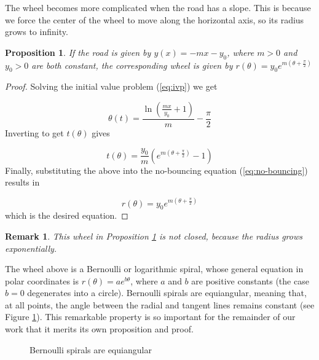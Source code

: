\documentclass{article}
\theoremstyle{theorem}
\newtheorem{prop}{Proposition}[section]
\theoremstyle{theorem}
\newtheorem{remark}{Remark}[section]
\begin{document}
The wheel becomes more complicated when the road has a slope. This is
because we force the center of the wheel to move along the horizontal
axis, so its radius grows to infinity.

\begin{prop}
  \label{spiral-wheel}
  If the road is given by $y(x)=-mx-y_0$, where $m>0$ and $y_0>0$ are
  both constant, the corresponding wheel is given by
  $r(\theta)=y_0e^{m(\theta+\frac{\pi}{2})}$
\end{prop}

\begin{proof}
  Solving the initial value problem (\ref{eq:ivp}) we get

  \begin{equation}
    \theta(t)=\frac{\ln\left(\frac{mx}{y_0}+1\right)}{m}-\frac{\pi}{2}
  \end{equation}
  Inverting to get $t(\theta)$ gives

\begin{equation}
  t(\theta) = \frac{y_0}{m}\left(e^{m\left(\theta+\frac{\pi}{2}\right)}-1\right)
\end{equation}
Finally, substituting the above into the no-bouncing equation
(\ref{eq:no-bouncing}) results in

\begin{equation}
  r(\theta)=y_0e^{m\left(\theta+\frac{\pi}{2}\right)}
\end{equation}
which is the desired equation.
\end{proof}

\begin{remark}
  This wheel in Proposition \ref{spiral-wheel} is not closed, because the
  radius grows exponentially.
\end{remark}

The wheel above is a Bernoulli or logarithmic spiral, whose general equation
in polar coordinates is $r(\theta)=ae^{b\theta}$, where
$a$ and $b$ are positive constants (the case $b=0$ degenerates into a circle). Bernoulli
spirals are equiangular, meaning that, at all points, the angle
between the radial and tangent lines remains constant (see Figure
\ref{fig:spiral}). This remarkable
property is so important for the remainder of our work that it merits
its own proposition and proof.

\begin{figure}
\centering

\caption{Bernoulli spirals are equiangular}
\label{fig:spiral}
\end{figure}
\end{document}
